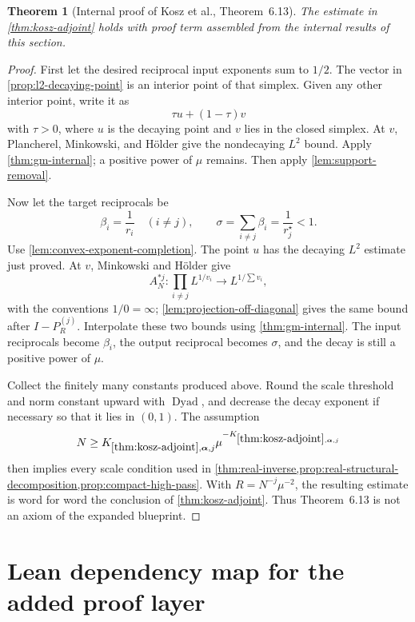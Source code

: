 \documentclass[11pt]{article}
\newtheorem{theorem}{Theorem}[section]
\newcommand{\Dyad}{\operatorname{Dyad}}
\newcommand{\Thr}[2]{K_{\ref{#1},#2}}
\begin{document}
	\begin{theorem}[Internal proof of Kosz et al., Theorem~6.13]\label{thm:kosz-613-internal}
		The estimate in \cref{thm:kosz-adjoint} holds with proof term assembled from the internal results of this section.
	\end{theorem}
	
	\begin{proof}
		First let the desired reciprocal input exponents sum to \(1/2\).  The vector in
		\cref{prop:l2-decaying-point} is an interior point of that simplex.  Given any other interior point, write it as
		\[
		\tau u+(1-\tau)v
		\]
		with \(\tau>0\), where \(u\) is the decaying point and \(v\) lies in the closed simplex.  At \(v\), Plancherel, Minkowski, and H\"older give the nondecaying \(L^2\) bound.  Apply \cref{thm:gm-internal}; a positive power of \(\mu\) remains.  Then apply
		\cref{lem:support-removal}.
		
		Now let the target reciprocals be
		\[
		\beta_i=\frac1{r_i}\quad(i\neq j),\qquad
		\sigma=\sum_{i\neq j}\beta_i
		=\frac1{r_j^\star}<1.
		\]
		Use \cref{lem:convex-exponent-completion}.  The point \(u\) has the decaying
		\(L^2\) estimate just proved.  At \(v\), Minkowski and H\"older give
		\[
		A_N^{*j}: \prod_{i\neq j}L^{1/v_i}
		\longrightarrow L^{1/\sum v_i},
		\]
		with the conventions \(1/0=\infty\); \cref{lem:projection-off-diagonal} gives the same bound after \(I-P_R^{(j)}\).  Interpolate these two bounds using
		\cref{thm:gm-internal}.  The input reciprocals become \(\beta_i\), the output reciprocal becomes \(\sigma\), and the decay is still a positive power of \(\mu\).
		
		Collect the finitely many constants produced above.  Round the scale threshold and norm constant upward with \(\Dyad\), and decrease the decay exponent if necessary so that it lies in \((0,1)\).  The assumption
		\[
		N\geq
		\Thr{thm:kosz-adjoint}{\boldsymbol\alpha,j}
		\mu^{-\Thr{thm:kosz-adjoint}{\boldsymbol\alpha,j}}
		\]
		then implies every scale condition used in
		\cref{thm:real-inverse,prop:real-structural-decomposition,prop:compact-high-pass}.
		With \(R=N^{-j}\mu^{-2}\), the resulting estimate is word for word the conclusion of
		\cref{thm:kosz-adjoint}.  Thus Theorem~6.13 is not an axiom of the expanded blueprint.
	\end{proof}
	
	\section{Lean dependency map for the added proof layer}\label{sec:lean-dependency-map}
	
\end{document}
